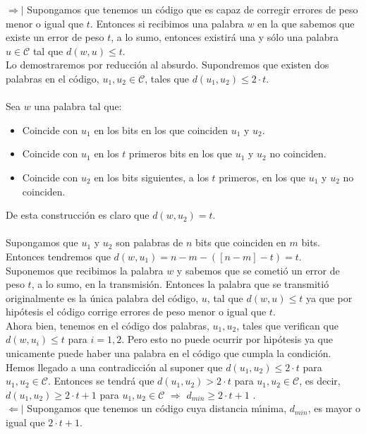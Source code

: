 $\Rightarrow |$ Supongamos que tenemos un c\'odigo que es capaz de corregir
errores de peso menor o igual que $t$. Entonces si recibimos una palabra $w$
en la que sabemos que existe un error de peso $t$, a lo sumo, entonces 
existir\'a una y s\'olo una palabra $u\in \mathcal{C}$ tal que $d(w,u)\leq t$.\\

Lo demostraremos por reducci\'on al absurdo. Supondremos que existen dos
palabras en el c\'odigo, $u_1,u_2 \in \mathcal{C}$, tales que
$d(u_1,u_2)\leq 2\cdot t$.\\ \\
%
Sea $w$ una palabra tal que:
\begin{itemize}
\item Coincide con $u_1$ en los bits en los que coinciden $u_1$ y $u_2$.
\item Coincide con $u_1$ en los $t$ primeros bits en los que $u_1$ y $u_2$ no
coinciden.
\item Coincide con $u_2$ en los bits siguientes, a los $t$ primeros, en los
que $u_1$ y $u_2$ no coinciden.
\end{itemize}
De esta construcci\'on es claro que $d(w,u_2) = t$.\\ \\
%
Supongamos que $u_1$ y $u_2$ son palabras de $n$ bits que coinciden en $m$
bits. Entonces tendremos que $d(w,u_1) = n-m-([n-m]-t) = t$.\\

Suponemos que recibimos la palabra $w$ y sabemos que se cometi\'o un error
de peso $t$, a lo sumo, en la transmisi\'on. Entonces la palabra que se
transmiti\'o originalmente es la \'unica palabra del c\'odigo, $u$, tal que
$d(w,u)\leq t$ ya que por hip\'otesis el c\'odigo corrige errores de peso
menor o igual que $t$.\\

Ahora bien, tenemos en el c\'odigo dos palabras, $u_1,u_2$, tales que verifican
que $d(w,u_i)\leq t$ para $i=1,2$. Pero esto no puede ocurrir por hip\'otesis
ya que unicamente puede haber una palabra en el c\'odigo que cumpla la
condici\'on. Hemos llegado a una contradicci\'on al suponer que
$d(u_1,u_2)\leq 2\cdot t$ para $u_1,u_2\in \mathcal{C}$. Entonces se tendr\'a
que $d(u_1,u_2) > 2\cdot t$ para $u_1,u_2\in \mathcal{C}$, es decir,
$d(u_1,u_2)\geq 2\cdot t+1$ para $u_1,u_2\in \mathcal{C}$ $\Longrightarrow$
$d_{min} \geq 2\cdot t +1$ .\\

$\Leftarrow |$ Supongamos que tenemos un c\'odigo cuya distancia m\'{\i}nima,
$d_{min}$, es mayor o igual que $2\cdot t +1$.\\

